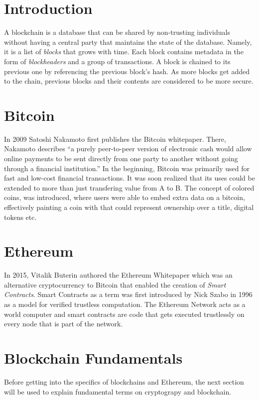\section{Introduction}
A blockchain is a database that can be shared by non-trusting individuals without having a central party that maintains the state of the database. Namely, it is a list of \textit{blocks} that grows with time. Each block contains metadata in the form of \textit{blockheaders} and a group of transactions. A block is chained to its previous one by referencing the previous block's hash. As more blocks get added to the chain, previous blocks and their contents are considered to be more secure.

\section{Bitcoin}
In 2009 Satoshi Nakamoto first publishes the Bitcoin whitepaper. There, Nakamoto describes ``a purely peer-to-peer version of electronic cash would allow online payments to be sent directly from one party to another without going through a financial institution.''
In the beginning, Bitcoin was primarily used for fast and low-cost financial transactions. It was soon realized that its uses could be extended to more than just transfering value from A to B. The concept of colored coins, \cite{colored} was introduced, where users were able to embed extra data on a bitcoin, effectively painting a coin with  that could represent ownership over a title, digital tokens etc.

\section{Ethereum}
In 2015, Vitalik Buterin authored the Ethereum Whitepaper \cite{vitalik} which was an alternative cryptocurrency to Bitcoin that enabled the creation of \textit{Smart Contracts}. Smart Contracts as a term was first introduced by Nick Szabo in 1996 as a model for verified trustless computation. The Ethereum Network acts as a world computer and smart contracts are code that gets executed trustlessly on every node that is part of the network. 

\pagebreak

\section{Blockchain Fundamentals}
Before getting into the specifics of blockchains and Ethereum, the next section will be used to explain fundamental terms on cryptograpy and blockchain.

